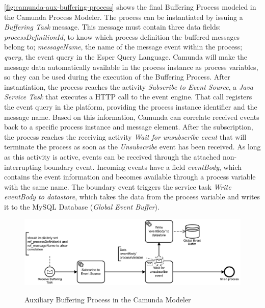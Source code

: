 \autoref{fig:camunda-aux-buffering-process} shows the final Buffering Process modeled in the Camunda Process Modeler. The process can be instantiated by issuing a \textit{Buffering Task} message. This message must contain three data fields: \textit{processDefinitionId}, to know which process definition the buffered messages belong to; \textit{messageName}, the name of the message event within the process; \textit{query}, the event query in the Esper Query Language.
Camunda will make the message data automatically available in the process instance as process variables, so they can be used during the execution of the Buffering Process.
After instantiation, the process reaches the activity \textit{Subscribe to Event Source}, a \textit{Java Service Task} that executes a HTTP call to the event engine. That call registers the event query in the platform, providing the process instance identifier and the message name. Based on this information, Camunda can correlate received events back to a specific process instance and message element.
After the subscription, the process reaches the receiving activity \textit{Wait for unsubscribe event} that will terminate the process as soon as the \textit{Unsubscribe} event has been received.
As long as this activity is active, events can be received through the attached non-interrupting boundary event. Incoming events have a field \textit{eventBody}, which contains the event information and becomes available through a process variable with the same name.
The boundary event triggers the service task \textit{Write eventBody to datastore}, which takes the data from the process variable and writes it to the MySQL Database (\textit{Global Event Buffer}).


\begin{figure}[]
	\myfloatalign
	{\includegraphics[width=1\linewidth]{chapters/assessment/buffering-process.PNG}}
	\caption{Auxiliary Buffering Process in the Camunda Modeler}\label{fig:camunda-aux-buffering-process}
\end{figure}

